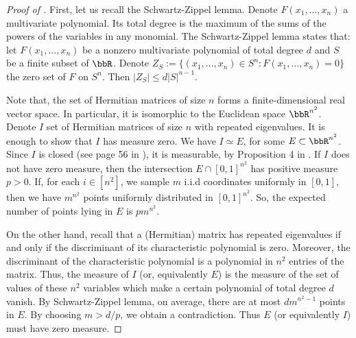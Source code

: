 \begin{proof}[Proof of ]
  First, let us recall the Schwartz-Zippel lemma. Denote $F(x_1, ..., x_n)$ a multivariate polynomial.
  Its total degree is the maximum of the sums of the powers of the variables in any monomial.
  The Schwartz-Zippel lemma states that: let $F(x_1, ..., x_n)$ be a nonzero multivariate polynomial
  of total degree $d$ and $S$ be a finite subset of $\bbR$. Denote
  $Z_S := \{ (x_1, ..., x_n) \in S^n : F(x_1, ..., x_n) = 0 \}$ the zero set of $F$ on $S^n$.
  Then $| Z_S | \leq d |S|^{n-1}$.

  Note that, the set of Hermitian matrices of size $n$ forms a finite-dimensional real vector space.
  In particular, it is isomorphic to the Euclidean space $\bbR^{n^2}$.
  Denote $I$ set of Hermitian matrices of size $n$ with repeated eigenvalues.
  It is enough to show that $I$ has measure zero. We have $I \simeq E$,
  for some $E \subset \bbR^{n^2}$. Since $I$ is closed (see page 56 in \citep{Tao12}),
  it is measurable, by Proposition 4 in \citep{Stein05}. If $I$ does not have zero measure,
  then the intersection $E \cap [0, 1]^{n^2}$ has positive measure $p > 0$. If,
  for each $i \in [n^2]$, we sample $m$ i.i.d coordinates uniformly in $[0, 1]$,
  then we have $m^{n^2}$ points uniformly distributed in $[0, 1]^{n^2}$. So,
  the expected number of points lying in $E$ is $pm^{n^2}$.

  On the other hand, recall that a (Hermitian) matrix has repeated eigenvalues if and only if
  the discriminant of its characteristic polynomial is zero. Moreover,
  the discriminant of the characteristic polynomial is a polynomial in $n^2$ entries of the matrix.
  Thus, the measure of $I$ (or, equivalently $E$) is the measure of the set of values of these
  $n^2$ variables which make a certain polynomial of total degree $d$ vanish.
  By Schwartz-Zippel lemma, on average, there are at most $d m^{n^2-1}$ points in $E$.
  By choosing $m > d / p$, we obtain a contradiction. Thus $E$ (or equivalently $I$)
  must have zero measure.
\end{proof}


